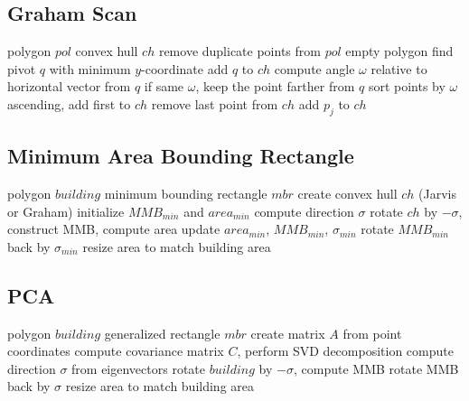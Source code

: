 \documentclass[11pt, a4paper]{article}
\begin{document}
\subsection{Graham Scan}
\begin{algorithm}[H] \caption{Graham Scan}
\begin{algorithmic}[1]
\Require polygon $pol$
\Ensure convex hull $ch$
\State remove duplicate points from $pol$
 \Return empty polygon \EndIf
\State find pivot $q$ with minimum $y$-coordinate
\State add $q$ to $ch$
    \State compute angle $\omega$ relative to horizontal vector from $q$
    \State if same $\omega$, keep the point farther from $q$
\EndFor
\State sort points by $\omega$ ascending, add first to $ch$
        \State remove last point from $ch$
    \EndWhile
    \State add $p_j$ to $ch$
\EndFor
\end{algorithmic}
\end{algorithm}

\subsection{Minimum Area Bounding Rectangle}
\begin{algorithm}[H] \caption{Minimum Area Bounding Rectangle}
\begin{algorithmic}[1]
\Require polygon $building$
\Ensure minimum bounding rectangle $mbr$
\State create convex hull $ch$ (Jarvis or Graham)
\State initialize $MMB_{min}$ and $area_{min}$
    \State compute direction $\sigma$
    \State rotate $ch$ by $-\sigma$, construct MMB, compute area
     update $area_{min}$, $MMB_{min}$, $\sigma_{min}$ \EndIf
\EndFor
\State rotate $MMB_{min}$ back by $\sigma_{min}$
\State resize area to match building area
\end{algorithmic}
\end{algorithm}

\subsection{PCA}
\begin{algorithm}[H] \caption{Principal Component Analysis}
\begin{algorithmic}[1]
\Require polygon $building$
\Ensure generalized rectangle $mbr$
\State create matrix $A$ from point coordinates
\State compute covariance matrix $C$, perform SVD decomposition
\State compute direction $\sigma$ from eigenvectors
\State rotate $building$ by $-\sigma$, compute MMB
\State rotate MMB back by $\sigma$
\State resize area to match building area
\end{algorithmic}
\end{algorithm}
\end{document}
